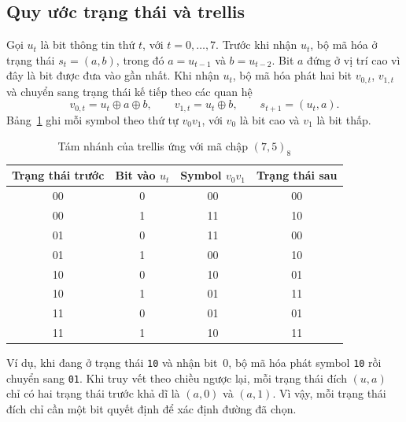 \documentclass[12pt,a4paper]{article}
\renewcommand{\_}{\originalunderscore\allowbreak}
\begin{document}
\subsection{Quy ước trạng thái và trellis}
Gọi $u_t$ là bit thông tin thứ $t$, với $t=0,\ldots,7$. Trước khi nhận $u_t$, bộ mã hóa ở trạng thái $s_t=(a,b)$, trong đó $a=u_{t-1}$ và $b=u_{t-2}$. Bit $a$ đứng ở vị trí cao vì đây là bit được đưa vào gần nhất. Khi nhận $u_t$, bộ mã hóa phát hai bit $v_{0,t}$, $v_{1,t}$ và chuyển sang trạng thái kế tiếp theo các quan hệ
\begin{equation}
v_{0,t}=u_t\oplus a\oplus b,\qquad
v_{1,t}=u_t\oplus b,\qquad s_{t+1}=(u_t,a).
\label{eq:encoder}
\end{equation}
Bảng~\ref{tab:trellis} ghi mỗi symbol theo thứ tự $v_0v_1$, với $v_0$ là bit cao và $v_1$ là bit thấp.
\begin{table}[H]\centering\small
\begin{tabular}{cccc}\toprule
\textbf{Trạng thái trước}&\textbf{Bit vào $u_t$}&\textbf{Symbol $v_0v_1$}&\textbf{Trạng thái sau}\\\midrule
00&0&00&00\\00&1&11&10\\01&0&11&00\\01&1&00&10\\
10&0&10&01\\10&1&01&11\\11&0&01&01\\11&1&10&11\\
\bottomrule\end{tabular}
\caption{Tám nhánh của trellis ứng với mã chập $(7,5)_8$}\label{tab:trellis}
\end{table}

Ví dụ, khi đang ở trạng thái \texttt{10} và nhận bit~0, bộ mã hóa phát symbol \texttt{10} rồi chuyển sang \texttt{01}. Khi truy vết theo chiều ngược lại, mỗi trạng thái đích $(u,a)$ chỉ có hai trạng thái trước khả dĩ là $(a,0)$ và $(a,1)$. Vì vậy, mỗi trạng thái đích chỉ cần một bit quyết định để xác định đường đã chọn.
\end{document}
